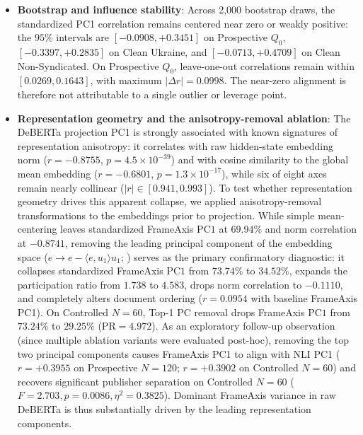 \begin{itemize}
    \item \textbf{Bootstrap and influence stability}: Across 2,000 bootstrap draws, the standardized PC1 correlation remains centered near zero or weakly positive: the $95\%$ intervals are $[-0.0908,+0.3451]$ on Prospective $Q_0$, $[-0.3397,+0.2835]$ on Clean Ukraine, and $[-0.0713,+0.4709]$ on Clean Non-Syndicated. On Prospective $Q_0$, leave-one-out correlations remain within $[0.0269,0.1643]$, with maximum $|\Delta r|=0.0998$. The near-zero alignment is therefore not attributable to a single outlier or leverage point.
    \item \textbf{Representation geometry and the anisotropy-removal ablation}: The DeBERTa projection PC1 is strongly associated with known signatures of representation anisotropy: it correlates with raw hidden-state embedding norm ($r = \mathbf{-0.8755}$, $p = 4.5 \times 10^{-39}$) and with cosine similarity to the global mean embedding ($r = \mathbf{-0.6801}$, $p = 1.3 \times 10^{-17}$), while six of eight axes remain nearly collinear ($|r| \in [0.941, 0.993]$). To test whether representation geometry drives this apparent collapse, we applied anisotropy-removal transformations to the embeddings prior to projection. While simple mean-centering leaves standardized FrameAxis $\mathrm{PC1}$ at $69.94\%$ and norm correlation at $-0.8741$, removing the leading principal component of the embedding space ($e \to e - \langle e, u_1 \rangle u_1$; \citealt{mu2018allbutthetop}) serves as the primary confirmatory diagnostic: it collapses standardized FrameAxis $\mathrm{PC1}$ from $\mathbf{73.74\%}$ to $\mathbf{34.52\%}$, expands the participation ratio from $1.738$ to $\mathbf{4.583}$, drops norm correlation to $-0.1110$, and completely alters document ordering ($r = 0.0954$ with baseline FrameAxis PC1). On Controlled $N=60$, Top-1 PC removal drops FrameAxis $\mathrm{PC1}$ from $73.24\%$ to $29.25\%$ ($\mathrm{PR} = 4.972$). As an exploratory follow-up observation (since multiple ablation variants were evaluated post-hoc), removing the top two principal components causes FrameAxis PC1 to align with NLI PC1 ($r = +0.3955$ on Prospective $N=120$; $r = +0.3902$ on Controlled $N=60$) and recovers significant publisher separation on Controlled $N=60$ ($F = \mathbf{2.703}, p = \mathbf{0.0086}, \eta^2 = \mathbf{0.3825}$). Dominant FrameAxis variance in raw DeBERTa is thus substantially driven by the leading representation components.

\end{itemize}
